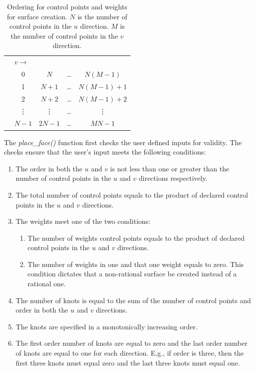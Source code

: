 \documentclass[a4paper, 12pt]{article}
\begin{document}
\begin{table}[H]
  \centering
  \begin{tabular}{l |c c c c |}
    \multicolumn{1}{c}{} & \multicolumn{4}{l}{ $v\longrightarrow$}\\
    \cline{2-5}
    \parbox[t]{2mm}{
        {}} 
    &0        & $N$     & \dots  & $N(M-1)$   \\
    &1        & $N+1$   & \dots  & $N(M-1)+1$ \\
    &2        & $N+2$   & \dots  & $N(M-1)+2$ \\
    &\vdots   & \vdots  & \dots  & \vdots     \\
    &$N-1$    & $2N-1$  & \dots  & $MN-1$     \\
  \end{tabular}
  \caption{Ordering for control points and 
    weights for surface creation. $N$ is 
    the number of control points in the $u$ direction. $M$ is the number of
    control points in the $v$ direction.}
  \label{table:cpNum}
\end{table}

The \emph{place\_face()} function first checks the user defined inputs
for validity. The checks ensure that the user's input meets the 
following conditions:
\begin{enumerate}
  \item The order in both the $u$ and $v$ is not less than one 
      or greater than
      the number of control points in the $u$ and $v$ 
      directions respectively. 
  \item The total number of control points equals to the product of 
      declared control points in the $u$ and $v$ directions.
  \item The weights meet one of the two conditions:
  \begin{enumerate}
    \item The number of weights control points equals to the product of 
        declared control points in the $u$ and $v$ directions.
    \item The number of weights in one and that one weight equals to zero. 
        This condition dictates that a non-rational surface be created 
        instead of a rational one.
  \end{enumerate}
  \item The number of knots is equal to the sum of the number of 
      control points
      and order in both the $u$ and $v$ directions.
  \item The knots are specified in a monotonically increasing order. 
  \item The first order number of knots are equal to zero and 
      the last order number 
      of knots are equal to one for each direction. 
      E.g., if order is three, then the first three
      knots must equal zero and the last three knots must equal one.
\end{enumerate}
\end{document}
